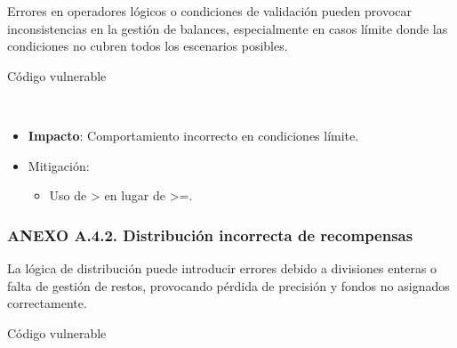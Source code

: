 Errores en operadores lógicos o condiciones de validación pueden
provocar inconsistencias en la gestión de balances, especialmente en
casos límite donde las condiciones no cubren todos los escenarios
posibles.

Código vulnerable

\begin{Shaded}
\begin{Highlighting}[]
 \NormalTok{ \{}

    \NormalTok{(balances[msg}\NormalTok{] }\OperatorTok{\textgreater{}}\OperatorTok{;}

\NormalTok{    balances[msg}\NormalTok{] }\OperatorTok{{-}=}\OperatorTok{;}

\NormalTok{\}}
\end{Highlighting}
\end{Shaded}

\begin{itemize}
\tightlist
\item
  \textbf{Impacto}: Comportamiento incorrecto en condiciones límite.
\item
  Mitigación:

  \begin{itemize}
  \tightlist
  \item
    Uso de \textgreater{} en lugar de \textgreater=.
  \end{itemize}
\end{itemize}

\subsubsection{ANEXO A.4.2. Distribución incorrecta de
recompensas}\label{anexo-a.4.2.-distribuciuxf3n-incorrecta-de-recompensas}

La lógica de distribución puede introducir errores debido a divisiones
enteras o falta de gestión de restos, provocando pérdida de precisión y
fondos no asignados correctamente.

Código vulnerable

